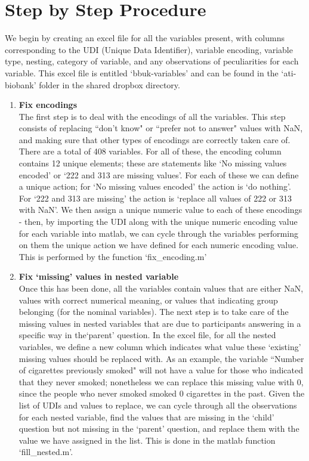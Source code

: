 \documentclass{article}
\begin{document}
\section*{Step by Step Procedure}
We begin by creating an excel file for all the variables present, with columns corresponding to the UDI (Unique Data Identifier), variable encoding, variable type, nesting, category of variable, and any observations of peculiarities for each variable. This excel file is entitled `bbuk-variables' and can be found in the `ati-biobank' folder in the shared dropbox directory. 
\begin{enumerate}
\subsubsection*{Encodings and Nested Variables}
\item {\bf Fix encodings} \\
The first step is to deal with the encodings of all the variables. This step consists of replacing ``don't know" or ``prefer not to answer" values with NaN, and making sure that other types of encodings are correctly taken care of. There are a total of 408 variables. For all of these, the encoding column contains 12 unique elements; these are statements like `No missing values encoded' or `222 and 313 are missing values'. For each of these we can define a unique action; for `No missing values encoded' the action is `do nothing'. For `222 and 313 are missing' the action is `replace all values of 222 or 313 with NaN'. We then assign a unique numeric value to each of these encodings - then, by importing the UDI along with the unique numeric encoding value for each variable into matlab, we can cycle through the variables performing on them the unique action we have defined for each numeric encoding value. This is performed by the function `fix\_encoding.m' \\
\item {\bf Fix `missing' values in nested variable} \\
Once this has been done, all the variables contain values that are either NaN, values with correct numerical meaning, or values that indicating group belonging (for the nominal variables). The next step is to take care of the missing values in nested variables that are due to participants answering in a specific way in the`parent' question. In the excel file, for all the nested variables, we define a new column which indicates what value these `existing' missing values should be replaced with. As an example, the variable ``Number of cigarettes previously smoked" will not have a value for those who indicated that they never smoked; nonetheless we can replace this missing value with 0, since the people who never smoked smoked 0 cigarettes in the past. Given the list of UDIs and values to replace, we can cycle through all the observations for each nested variable, find the values that are missing in the `child' question but not missing in the `parent' question, and replace them with the value we have assigned in the list. This is done in the matlab function `fill\_nested.m'. 
     \\
\vspace{-0.5cm}

\end{enumerate}
\end{document}
